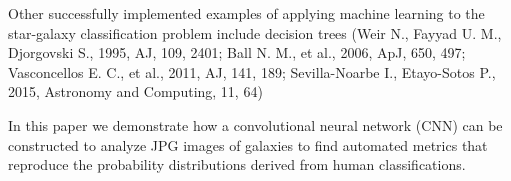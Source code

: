 Other successfully implemented examples of applying machine learning to the star-galaxy classification problem include decision trees (Weir N., Fayyad U. M., Djorgovski S., 1995, AJ, 109, 2401; Ball N. M., et al., 2006, ApJ, 650, 497; Vasconcellos E. C., et al., 2011, AJ, 141, 189; Sevilla-Noarbe I., Etayo-Sotos P., 2015, Astronomy and Computing, 11, 64)

In this paper we demonstrate how a convolutional neural network (CNN) can be constructed to analyze JPG images of galaxies to find automated metrics that reproduce the probability distributions derived from human classifications.

